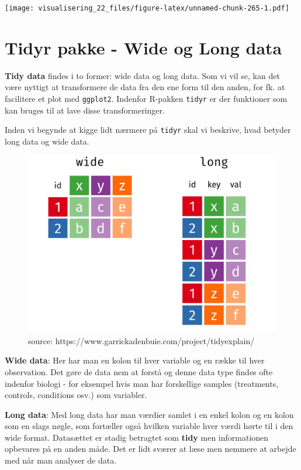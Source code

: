 \documentclass[
]{book}
\begin{document}
\texttt{[image: visualisering\_22\_files/figure-latex/unnamed-chunk-265-1.pdf]}

\hypertarget{tidyr-pakke---wide-og-long-data}{%
\section{Tidyr pakke - Wide og Long data}\label{tidyr-pakke---wide-og-long-data}}

\textbf{Tidy data} findes i to former: wide data og long data. Som vi vil se, kan det være nyttigt at transformere de data fra den ene form til den anden, for fk. at facilitere et plot med \texttt{ggplot2}. Indenfor R-pakken \texttt{tidyr} er der funktioner som kan bruges til at lave disse transformeringer.

Inden vi begynde at kigge lidt nærmere på \texttt{tidyr} skal vi beskrive, hvad betyder long data og wide data.

\begin{figure}
\includegraphics[width=0.75\linewidth]{plots/original-dfs-tidy} \caption{source: https://www.garrickadenbuie.com/project/tidyexplain/}\label{fig:unnamed-chunk-266}
\end{figure}

\textbf{Wide data}: Her har man en kolon til hver variable og en række til hver observation. Det gøre de data nem at forstå og denne data type findes ofte indenfor biologi - for eksempel hvis man har forskellige samples (treatments, controls, conditions osv.) som variabler.

\textbf{Long data}: Med long data har man værdier samlet i en enkel kolon og en kolon som en slags nøgle, som fortæller også hvilken variable hver værdi hørte til i den wide format. Datasættet er stadig betragtet som \textbf{tidy} men informationen opbevares på en anden måde. Det er lidt sværer at læse men nemmere at arbejde med når man analyser de data.
\end{document}
